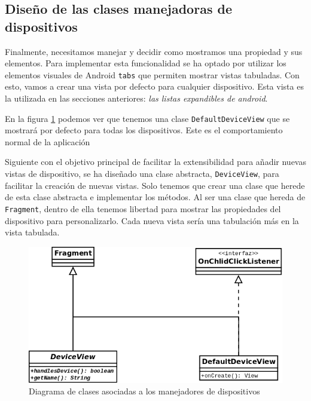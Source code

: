 \newpage
\subsection{Diseño de las clases manejadoras de dispositivos}

Finalmente, necesitamos manejar y decidir como mostramos una propiedad y sus elementos. Para implementar esta funcionalidad se ha optado por utilizar los elementos visuales de Android \texttt{tabs} que permiten mostrar vistas tabuladas. Con esto, vamos a crear una vista por defecto para cualquier dispositivo. Esta vista es la utilizada en las secciones anteriores: \textit{las listas expandibles de android}.

\bigskip
En la figura \ref{fig:diag_manager_ui_device} podemos ver que tenemos una clase \texttt{DefaultDeviceView} que se mostrará por defecto para todas los dispositivos. Este es el comportamiento normal de la aplicación

\bigskip
Siguiente con el objetivo principal de facilitar la extensibilidad para añadir nuevas vistas de dispositivo, se ha diseñado una clase abstracta, \texttt{DeviceView}, para facilitar la creación de nuevas vistas. Solo tenemos que crear una clase que herede de esta clase abstracta e implementar los métodos. Al ser una clase que hereda de \texttt{Fragment}, dentro de ella tenemos libertad para mostrar las propiedades del dispositivo para personalizarlo. Cada nueva vista sería una tabulación más en la vista tabulada.


\bigskip
\begin{figure}[!ht]
  \begin{center}
  \includegraphics[width=1\textwidth]{../images/device_ui.png}
  \caption{Diagrama de clases asociadas a los manejadores de dispositivos}
  \label{fig:diag_manager_ui_device}
  \end{center}
\end{figure}


